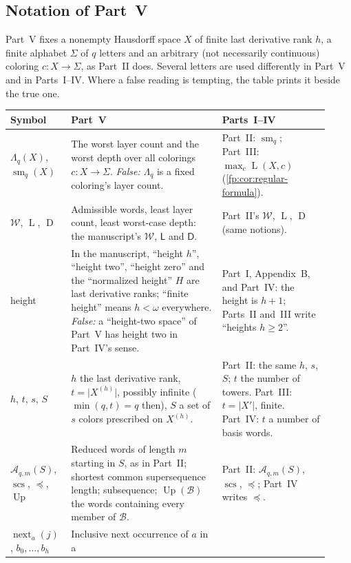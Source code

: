 \documentclass[11pt,letterpaper]{article}
\numberwithin{equation}{section}
\theoremstyle{definition}
\theoremstyle{remark}
\theoremstyle{definition}
\newcommand{\W}{\mathcal W}
\newcommand{\A}{\mathcal A}
\newcommand{\scs}{\operatorname{scs}}
\newcommand{\depth}{\operatorname{D}}
\newcommand{\layers}{\operatorname{L}}
\newcommand{\smq}{\operatorname{sm}_{q}}
\newcommand{\subseq}{\preccurlyeq}
\newcommand{\nextpos}{\operatorname{next}}
\begin{document}
\subsection{Notation of Part~V}
\label{uw:sec:notation}
Part~V fixes a nonempty Hausdorff space $X$ of finite last derivative rank
$h$, a finite alphabet $\Sigma$ of $q$ letters and an arbitrary (not
necessarily continuous) coloring $c:X\to\Sigma$, as Part~II does. Several
letters are used differently in Part~V and in Parts~I--IV. Where a false
reading is tempting, the table prints it beside the true one.
\begin{center}\small
\begin{longtable}{@{}>{\raggedright\arraybackslash}p{0.15\linewidth}>{\raggedright\arraybackslash}p{0.45\linewidth}>{\raggedright\arraybackslash}p{0.32\linewidth}@{}}
\toprule
Symbol & Part~V & Parts~I--IV\\
\midrule
\endhead
$\Lambda_q(X)$, $\smq(X)$ & The worst layer count and the worst depth over
all colorings $c:X\to\Sigma$. \emph{False:} $\Lambda_q$ is a fixed
coloring's layer count. & Part~II: $\smq$; Part~III: $\max_c\layers(X,c)$
(\cref{fp:cor:regular-formula}).\\
$\W$, $\layers$, $\depth$ & Admissible words, least layer count, least
worst-case depth: the manuscript's $\W$, $\mathsf L$ and $\mathsf D$. &
Part~II's $\W$, $\layers$, $\depth$ (same notions).\\
height & In the manuscript, ``height $h$'', ``height two'', ``height
zero'' and the ``normalized height'' $H$ are last derivative ranks;
``finite height'' means $h<\omega$ everywhere. \emph{False:} a
``height-two space'' of Part~V has height two in Part~IV's sense. &
Part~I, Appendix~B, and Part~IV: the height is $h+1$; Parts~II and~III
write ``heights $h\ge2$''.\\
$h$, $t$, $s$, $S$ & $h$ the last derivative rank, $t=\lvert
X^{(h)}\rvert$, possibly infinite ($\min(q,t)=q$ then), $S$ a set of $s$
colors prescribed on $X^{(h)}$. & Part~II: the same $h$, $s$, $S$; $t$ the
number of towers. Part~III: $t=\lvert X'\rvert$, finite. Part~IV: $t$ a
number of basis words.\\
$\A_{q,m}(S)$, $\scs$, $\subseq$, $\operatorname{Up}$ & Reduced words of
length $m$ starting in $S$, as in Part~II; shortest common supersequence
length; subsequence; $\operatorname{Up}(\mathcal B)$ the words containing
every member of $\mathcal B$. & Part~II: $\A_{q,m}(S)$, $\scs$, $\subseq$;
Part~IV writes $\preceq$.\\
$\nextpos_a(j)$, $b_0,\ldots,b_h$ & Inclusive next occurrence of $a$ in a

\end{longtable}
\end{center}
\end{document}
